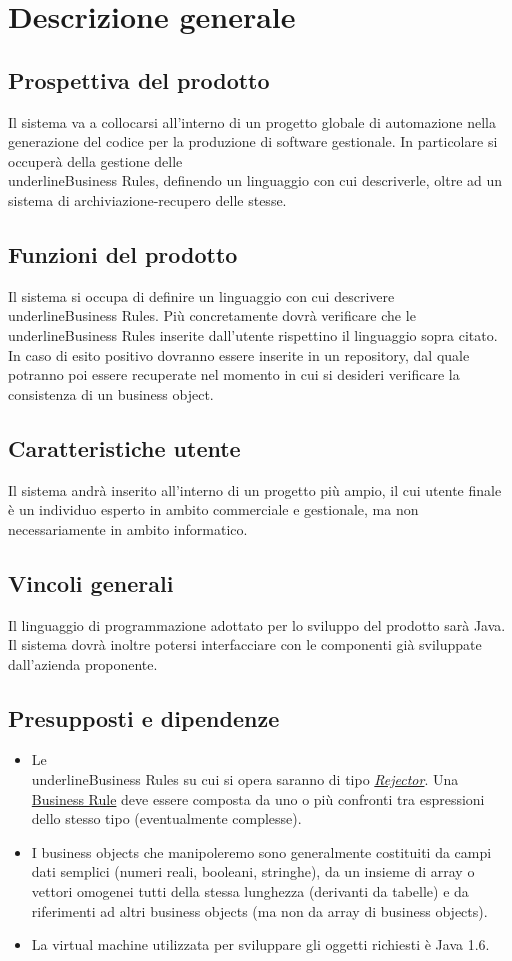 \chapter{Descrizione generale}
\section{Prospettiva del prodotto}
Il sistema va a collocarsi all'interno di un progetto globale di automazione nella generazione del codice per la produzione di software gestionale. In particolare si occuper\`a della gestione delle \\underline{Business Rules}, definendo un linguaggio con cui descriverle, oltre ad un sistema di archiviazione-recupero delle stesse.
\section{Funzioni del prodotto}
Il sistema si occupa di definire un linguaggio con cui descrivere \\underline{Business Rules}. Pi\`u concretamente dovr\`a verificare che le \\underline{Business Rules} inserite dall'utente rispettino il linguaggio sopra citato. In caso di esito positivo dovranno essere inserite in un repository, dal quale potranno poi essere recuperate nel momento in cui si desideri verificare la consistenza di un business object.
\section{Caratteristiche utente}
Il sistema andr\`a inserito all'interno di un progetto pi\`u ampio, il cui utente finale \`e un individuo esperto in ambito commerciale e gestionale, ma non necessariamente in ambito informatico.
\section{Vincoli generali}
Il linguaggio di programmazione adottato per lo sviluppo del prodotto sar\`a Java. Il sistema dovr\`a inoltre potersi interfacciare con le componenti gi\`a sviluppate dall'azienda proponente. 
\section{Presupposti e dipendenze}
\begin{itemize}
\item{Le \\underline{Business Rules} su cui si opera saranno di tipo \textit{\underline{Rejector}}. Una \underline{Business Rule} deve essere composta da uno o pi\`u confronti tra espressioni dello stesso tipo (eventualmente complesse).}
\item{I business objects che manipoleremo sono generalmente costituiti da campi dati semplici (numeri reali, booleani, stringhe), da un insieme di array o vettori omogenei tutti della stessa lunghezza (derivanti da tabelle) e da riferimenti ad altri business objects (ma non da array di business objects).
}
\item{La virtual machine utilizzata  per sviluppare gli oggetti richiesti \`e Java 1.6.}
\end{itemize}

